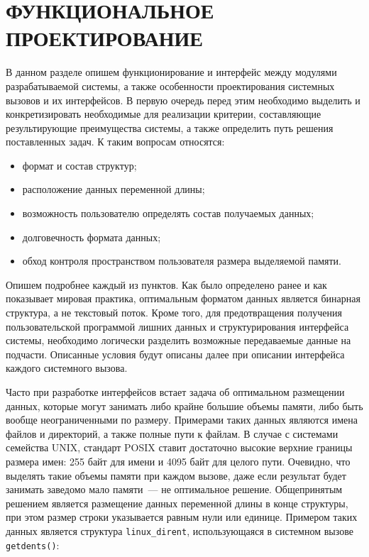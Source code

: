 \section{ФУНКЦИОНАЛЬНОЕ ПРОЕКТИРОВАНИЕ}
\label{sec:func}

В данном разделе опишем функционирование и интерфейс между модулями
разрабатываемой системы, а также особенности проектирования системных вызовов и
их интерфейсов. В первую очередь перед этим необходимо выделить и
конкретизировать необходимые для реализации критерии, составляющие
результирующие преимущества системы, а также определить путь решения
поставленных задач. К таким вопросам относятся:

\begin{itemize}
\item формат и состав структур;
\item расположение данных переменной длины;
\item возможность пользователю определять состав получаемых данных;
\item долговечность формата данных;
\item обход контроля пространством пользователя размера выделяемой памяти.
\end{itemize}

Опишем подробнее каждый из пунктов. Как было определено ранее и как показывает
мировая практика, оптимальным форматом данных является бинарная структура, а не
текстовый поток. Кроме того, для предотвращения получения пользовательской
программой лишних данных и структурирования интерфейса системы, необходимо
логически разделить возможные передаваемые данные на подчасти. Описанные условия
будут описаны далее при описании интерфейса каждого системного вызова.

Часто при разработке интерфейсов встает задача об оптимальном размещении данных,
которые могут занимать либо крайне большие объемы памяти, либо быть вообще
неограниченными по размеру. Примерами таких данных являются имена файлов и
директорий, а также полные пути к файлам. В случае с системами семейства UNIX,
стандарт POSIX ставит достаточно высокие верхние границы размера имен: 255 байт
для имени и 4095 байт для целого пути. Очевидно, что выделять такие объемы
памяти при каждом вызове, даже если результат будет занимать заведомо мало
памяти~--- не оптимальное решение. Общепринятым решением является размещение
данных переменной длины в конце структуры, при этом размер строки указывается
равным нули или единице. Примером таких данных является структура
\texttt{linux\_dirent}, использующаяся в системном вызове \texttt{getdents()}:


